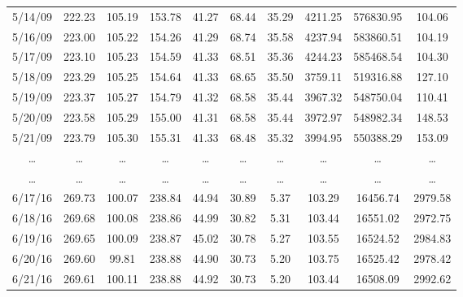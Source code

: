 \documentclass[12pt,a4paper]{report}
\begin{document}
\begin{longtable}[c]{| c | c | c |c |c |c |c |c |c |c |}
5/14/09       & 222.23       & 105.19       & 153.78      & 41.27           & 68.44        & 35.29        & 4211.25      & 576830.95    & 104.06       \\
5/16/09       & 223.00       & 105.22       & 154.26      & 41.29           & 68.74        & 35.58        & 4237.94      & 583860.51    & 104.19       \\
5/17/09       & 223.10       & 105.23       & 154.59      & 41.33           & 68.51        & 35.36        & 4244.23      & 585468.54    & 104.30       \\
5/18/09       & 223.29       & 105.25       & 154.64      & 41.33           & 68.65        & 35.50        & 3759.11      & 519316.88    & 127.10       \\
5/19/09       & 223.37       & 105.27       & 154.79      & 41.32           & 68.58        & 35.44        & 3967.32      & 548750.04    & 110.41       \\
5/20/09       & 223.58       & 105.29       & 155.00      & 41.31           & 68.58        & 35.44        & 3972.97      & 548982.34    & 148.53       \\
5/21/09       & 223.79       & 105.30       & 155.31      & 41.33           & 68.48        & 35.32        & 3994.95      & 550388.29    & 153.09       \\
…             & …            & …            & …           & …               & …            & …            & …            & …            & …            \\
…             & …            & …            & …           & …               & …            & …            & …            & …            & …            \\
6/17/16       & 269.73       & 100.07       & 238.84      & 44.94           & 30.89        & 5.37         & 103.29       & 16456.74     & 2979.58      \\
6/18/16       & 269.68       & 100.08       & 238.86      & 44.99           & 30.82        & 5.31         & 103.44       & 16551.02     & 2972.75      \\
6/19/16       & 269.65       & 100.09       & 238.87      & 45.02           & 30.78        & 5.27         & 103.55       & 16524.52     & 2984.83      \\
6/20/16       & 269.60       & 99.81        & 238.88      & 44.90           & 30.73        & 5.20         & 103.75       & 16525.42     & 2978.42      \\
6/21/16       & 269.61       & 100.11       & 238.88      & 44.92           & 30.73        & 5.20         & 103.44       & 16508.09     & 2992.62      \\

\end{longtable}
\end{document}

